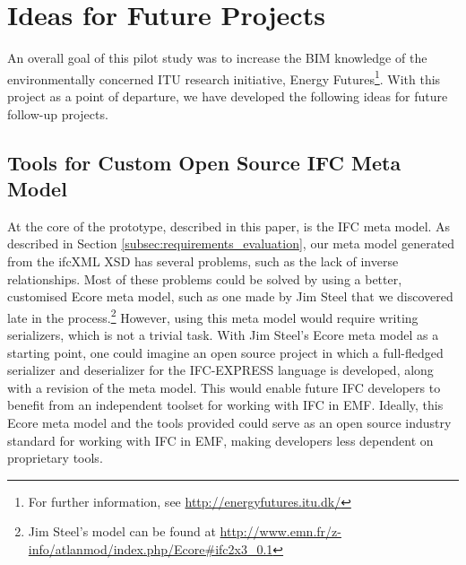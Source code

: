 
\section{Ideas for Future Projects}
\label{sec:plan_for_future_projects}
An overall goal of this pilot study was to increase the BIM knowledge of the environmentally concerned ITU research initiative, Energy Futures\footnote{For further information, see \url{http://energyfutures.itu.dk/}}. With this project as a point of departure, we have developed the following ideas for future follow-up projects.

\subsection{Tools for Custom Open Source IFC Meta Model}
At the core of the prototype, described in this paper, is the IFC meta model. As described in Section \ref{subsec:requirements_evaluation}, our meta model generated from the ifcXML XSD has several problems, such as the lack of inverse relationships. Most of these problems could be solved by using a better, customised Ecore meta model, such as one made by Jim Steel that we discovered late in the process.\footnote{Jim Steel's model can be found at \url{http://www.emn.fr/z-info/atlanmod/index.php/Ecore#ifc2x3_0.1}} However, using this meta model would require writing serializers, which is not a trivial task. With Jim Steel's Ecore meta model as a starting point, one could imagine an open source project in which a full-fledged serializer and deserializer for the IFC-EXPRESS language is developed, along with a revision of the meta model. This would enable future IFC developers to benefit from an independent toolset for working with IFC in EMF. Ideally, this Ecore meta model and the tools provided could serve as an open source industry standard for working with IFC in EMF, making developers less dependent on proprietary tools.

